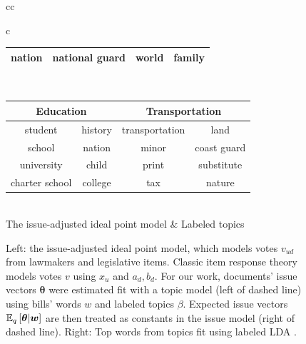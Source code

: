 \begin{figure}
\begin{tabular}{cc}
\begin{tabular}{c}
\begin{tabular}{|cc|cc|}
    nation & national guard & world & family \\
    \hline
  \end{tabular} \\
  \begin{tabular}{|cc|cc|}
    \hline
    \multicolumn{2}{|c|}{\textbf{Education}} & \multicolumn{2}{|c|}{\textbf{Transportation}}  \\
    \hline
    student & history & transportation & land \\
    school & nation & minor & coast guard \\
    university & child & print & substitute \\
    charter school & college & tax & nature \\
    \hline
  \end{tabular}
 \vspace{110pt}
\end{tabular}
        \vspace{-100pt}
 \\
 \normalsize
%
        The issue-adjusted ideal point model & Labeled topics \\
    \end{tabular}
  \caption{Left: the issue-adjusted ideal point model, which models votes
    $v_{ud}$ from lawmakers and legislative items.  Classic item
    response theory models votes $v$ using $x_u$ and $a_d, b_d$.
    For our work, documents' issue vectors $\bm \theta$ were estimated fit with a topic
    model (left of dashed line) using bills' words $w$ and labeled topics
    $\beta$.  Expected issue vectors $\mathbb{E}_q\left[\bm \theta | \bm w\right]$ are then treated as constants
    in the issue model (right of dashed line).
  Right: Top words from topics fit using labeled LDA \cite{ramage:2009}.
  }
  \vspace{-5pt}
  \label{figure:legis_gm}
  \label{table:example_topics}
\end{figure}
